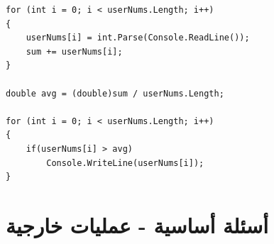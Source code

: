 \documentclass[14pt]{extarticle}
\begin{document}
\begin{enumerate}[itemsep=2em]
\begin{boxSolution}
\begin{english}
\begin{verbatim}
for (int i = 0; i < userNums.Length; i++)
{
    userNums[i] = int.Parse(Console.ReadLine());
    sum += userNums[i];
}

double avg = (double)sum / userNums.Length;

for (int i = 0; i < userNums.Length; i++)
{
    if(userNums[i] > avg)
        Console.WriteLine(userNums[i]);
}
    \end{verbatim}
    \end{english}
    \end{boxSolution}
    \fi

\end{enumerate}

\clearpage

\section{أسئلة أساسية - عمليات خارجية}
\end{document}
